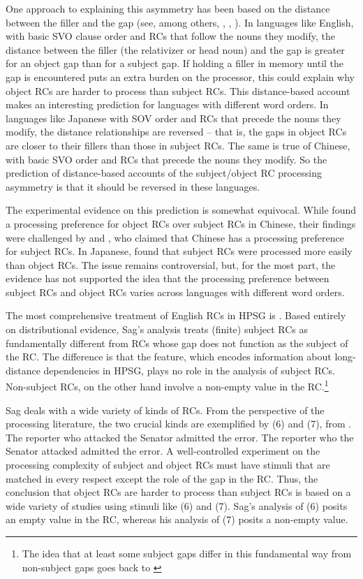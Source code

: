 \documentclass[a4paper]{article}
\begin{document}
One approach to explaining this asymmetry has been based on the distance between the filler and the gap (see, among others, \citet{WannerMaratsos78}, \citet{Gibson98a}, \citet{Hawkins2004a-u}).  In languages like English, with basic SVO clause order and RCs that follow the nouns they modify, the distance between the filler (the relativizer or head noun) and the gap is greater for an object gap than for a subject gap.  If holding a filler in memory until the gap is encountered puts an extra burden on the processor, this could explain why object RCs are harder to process than subject RCs.   This distance-based account makes an interesting prediction for languages with different word orders.  In languages like Japanese with SOV order and RCs that precede the nouns they modify, the distance relationships are reversed -- that is, the gaps in object RCs are closer to their fillers than those in subject RCs.  The same is true of Chinese, with basic SVO order and RCs that precede the nouns they modify.  So the prediction of distance-based accounts of the subject/object RC processing asymmetry is that it should be reversed in these languages.

The experimental evidence on this prediction is somewhat equivocal.  While \citet{HsiaoGibson03} found a processing preference for object RCs over subject RCs in Chinese, their findings were challenged by \citet{LinBever2006} and \citet{VasishthEtal2013}, who claimed that Chinese has a processing preference for subject RCs.  In Japanese, \citet{MiyamotoNakamura2003} found that subject RCs were processed more easily than object RCs.  The issue remains controversial, but, for the most part, the evidence has not supported the idea that the processing preference between subject RCs and object RCs varies across languages with different word orders.

The most comprehensive treatment of English RCs in HPSG is \citet{Sag97a}. Based entirely on distributional evidence, Sag's analysis treats (finite) subject RCs as fundamentally different from RCs whose gap does not function as the subject of the RC.  The difference is that the \slasch feature, which encodes information about long-distance dependencies in HPSG, plays no role in the analysis of subject RCs.  Non-subject RCs, on the other hand involve a non-empty \slasch value in the RC.\footnote{The idea that at least some subject gaps differ in this fundamental way from non-subject gaps goes back to \citet{Gazdar81}}   

Sag deals with a wide variety of kinds of RCs. From the perspective of the processing literature, the two crucial kinds are exemplified by (6) and (7), from \citet{Gibson98a}.
\eal
\ex The reporter who attacked the Senator admitted the error.
\ex The reporter who the Senator attacked admitted the error.
\zl
A well-controlled experiment on the processing complexity of subject and object RCs must have stimuli that are matched in every respect except the role of the gap in the RC.  Thus, the conclusion that object RCs are harder to process than subject RCs is based on a wide variety of studies using stimuli like (6) and (7).  Sag's analysis of (6) posits an empty \slasch value in the RC, whereas his analysis of (7) posits a non-empty \slasch value.  
\end{document}
